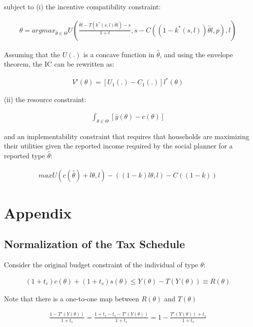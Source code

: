 subject to (i) the incentive compatibility constraint: 

\begin{align}
    \theta = argmax_{\hat{\theta} \in \Theta}U\left(\frac{\hat{\theta} l-T(k^*(s,l)\hat{\theta} l)-s}{1+t}, s-C((1-k^*(s,l))\hat{\theta} l,p),l\right) \nonumber
\end{align}

Assuming that the $U(.)$ is a concave function in $\hat{\theta}$, and using the envelope theorem, the IC can be rewritten as: 

\begin{align}
    V'(\theta)=[U_1(.)-C_1(.)]l^*(\theta)
\end{align}

(ii) the resource constraint:

\begin{align}
    \int_{\theta\in\Theta}[\bar{y}(\theta)-c(\theta)]
\end{align}

and an implementability constraint that requires that households are maximizing their utilities given the reported income required by the social planner for a reported type $\hat{\theta}$:

\begin{align}
    max U(c(\hat{\theta})+l \theta, l)-((1-k)l\theta, l)-C((1-k))
\end{align}

\section{Appendix}

\subsection{Normalization of the Tax Schedule}

Consider the original budget constraint of the individual of type $\theta$:

\begin{align}
    (1+t_c)c(\theta)+(1+t_s)s(\theta)\leq Y(\theta)-T(Y(\theta)) \equiv R(\theta)
    \label{budget}
\end{align}

Note that there is a one-to-one map between $R(\theta)$ and $T(\theta)$

\begin{align*}
    \frac{1-T'(Y(\theta))}{1+t_s}=\frac{1+t_s-t_s-T'(Y(\theta))}{1+t_s}=1-\frac{T'(Y(\theta))+t_s}{1+t_s}
\end{align*}

